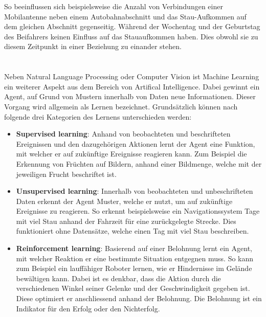 So beeinflussen sich beispielsweise die Anzahl von Verbindungen einer Mobilantenne neben einem Autobahnabschnitt und das Stau-Aufkommen auf dem gleichen Abschnitt gegenseitig. Während der Wochentag und der Geburtstag des Beifahrers keinen Einfluss auf das Stauaufkommen haben. Dies obwohl sie zu diesem Zeitpunkt in einer Beziehung zu einander stehen.


\section{}



Neben \gls{Natural Language Processing} oder \gls{Computer Vision} ist \gls{Machine Learning} ein weiterer Aspekt aus dem Bereich von \gls{Artifical Intelligence}. Dabei gewinnt ein Agent, auf Grund von Mustern innerhalb von Daten neue Informationen. Dieser Vorgang wird allgemein als Lernen bezeichnet. Grundsätzlich können nach \cite{Russell:2009:AIM:1671238} folgende drei Kategorien des Lernens unterschieden werden:

\begin{itemize}
    \item \textbf{Supervised learning}: Anhand von beobachteten und beschrifteten Ereignissen und den dazugehörigen Aktionen lernt der Agent eine Funktion, mit welcher er auf zukünftige Ereignisse reagieren kann. Zum Beispiel die Erkennung von Früchten auf Bildern, anhand einer Bildmenge, welche mit der jeweiligen Frucht beschriftet ist.
    \item \textbf{Unsupervised learning}: Innerhalb von beobachteten und unbeschrifteten Daten erkennt der Agent Muster, welche er nutzt, um auf zukünftige Ereignisse zu reagieren. So erkennt beispielsweise ein Navigationssystem Tage mit viel Stau anhand der Fahrzeit für eine zurückgelegte Strecke. Dies funktioniert ohne Datensätze, welche einen Tag mit viel Stau beschreiben.
    \item \textbf{Reinforcement learning}: Basierend auf einer Belohnung lernt ein Agent, mit welcher Reaktion er eine bestimmte Situation entgegnen muss. So kann zum Beispiel ein lauffähiger Roboter lernen, wie er Hindernisse im Gelände bewältigen kann. Dabei ist es denkbar, dass die Aktion durch die verschiedenen Winkel seiner Gelenke und der Geschwindigkeit gegeben ist. Diese optimiert er anschliessend anhand der Belohnung. Die Belohnung ist ein Indikator für den Erfolg oder den Nichterfolg.
\end{itemize}

